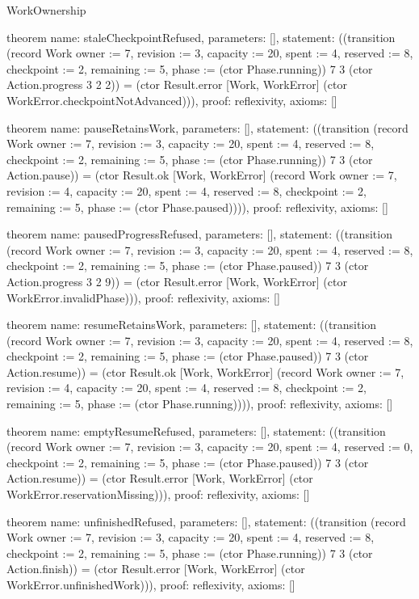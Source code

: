 \begin{lexlean}{WorkOwnership}
\begin{semanticmodule}
theorem{
  name: staleCheckpointRefused,
  parameters: [],
  statement: ((transition (record Work {owner := 7, revision := 3, capacity := 20, spent := 4, reserved := 8, checkpoint := 2, remaining := 5, phase := (ctor Phase.running)}) 7 3 (ctor Action.progress 3 2 2)) = (ctor Result.error [Work, WorkError] (ctor WorkError.checkpointNotAdvanced))),
  proof: reflexivity{},
  axioms: []
}

theorem{
  name: pauseRetainsWork,
  parameters: [],
  statement: ((transition (record Work {owner := 7, revision := 3, capacity := 20, spent := 4, reserved := 8, checkpoint := 2, remaining := 5, phase := (ctor Phase.running)}) 7 3 (ctor Action.pause)) = (ctor Result.ok [Work, WorkError] (record Work {owner := 7, revision := 4, capacity := 20, spent := 4, reserved := 8, checkpoint := 2, remaining := 5, phase := (ctor Phase.paused)}))),
  proof: reflexivity{},
  axioms: []
}

theorem{
  name: pausedProgressRefused,
  parameters: [],
  statement: ((transition (record Work {owner := 7, revision := 3, capacity := 20, spent := 4, reserved := 8, checkpoint := 2, remaining := 5, phase := (ctor Phase.paused)}) 7 3 (ctor Action.progress 3 2 9)) = (ctor Result.error [Work, WorkError] (ctor WorkError.invalidPhase))),
  proof: reflexivity{},
  axioms: []
}

theorem{
  name: resumeRetainsWork,
  parameters: [],
  statement: ((transition (record Work {owner := 7, revision := 3, capacity := 20, spent := 4, reserved := 8, checkpoint := 2, remaining := 5, phase := (ctor Phase.paused)}) 7 3 (ctor Action.resume)) = (ctor Result.ok [Work, WorkError] (record Work {owner := 7, revision := 4, capacity := 20, spent := 4, reserved := 8, checkpoint := 2, remaining := 5, phase := (ctor Phase.running)}))),
  proof: reflexivity{},
  axioms: []
}

theorem{
  name: emptyResumeRefused,
  parameters: [],
  statement: ((transition (record Work {owner := 7, revision := 3, capacity := 20, spent := 4, reserved := 0, checkpoint := 2, remaining := 5, phase := (ctor Phase.paused)}) 7 3 (ctor Action.resume)) = (ctor Result.error [Work, WorkError] (ctor WorkError.reservationMissing))),
  proof: reflexivity{},
  axioms: []
}

theorem{
  name: unfinishedRefused,
  parameters: [],
  statement: ((transition (record Work {owner := 7, revision := 3, capacity := 20, spent := 4, reserved := 8, checkpoint := 2, remaining := 5, phase := (ctor Phase.running)}) 7 3 (ctor Action.finish)) = (ctor Result.error [Work, WorkError] (ctor WorkError.unfinishedWork))),
  proof: reflexivity{},
  axioms: []
}


\end{semanticmodule}
\end{lexlean}
